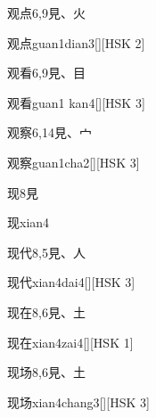 \begin{entry}{观点}{6,9}{⾒、⽕}
  \begin{phonetics}{观点}{guan1dian3}[][HSK 2]
  \end{phonetics}
\end{entry}

\begin{entry}{观看}{6,9}{⾒、⽬}
  \begin{phonetics}{观看}{guan1 kan4}[][HSK 3]
  \end{phonetics}
\end{entry}

\begin{entry}{观察}{6,14}{⾒、⼧}
  \begin{phonetics}{观察}{guan1cha2}[][HSK 3]
  \end{phonetics}
\end{entry}

\begin{entry}{现}{8}{⾒}
  \begin{phonetics}{现}{xian4}
  \end{phonetics}
\end{entry}

\begin{entry}{现代}{8,5}{⾒、⼈}
  \begin{phonetics}{现代}{xian4dai4}[][HSK 3]
  \end{phonetics}
\end{entry}

\begin{entry}{现在}{8,6}{⾒、⼟}
  \begin{phonetics}{现在}{xian4zai4}[][HSK 1]
  \end{phonetics}
\end{entry}

\begin{entry}{现场}{8,6}{⾒、⼟}
  \begin{phonetics}{现场}{xian4chang3}[][HSK 3]
  \end{phonetics}
\end{entry}

